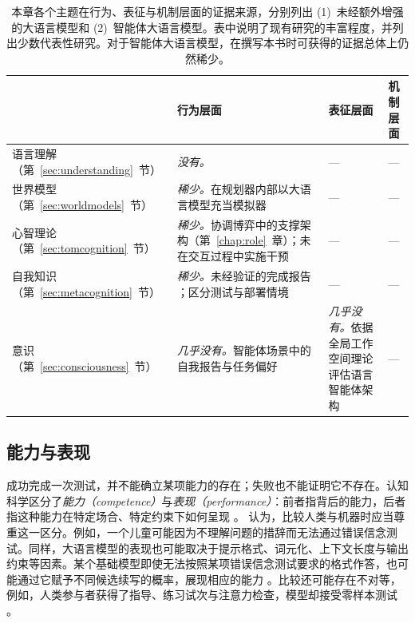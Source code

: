 \begin{table}
\begin{subtable}{\textwidth}
\begin{tabularx}{\linewidth}{@{}p{2.1cm}XXX@{}}
\toprule
 & \textbf{行为层面} & \textbf{表征层面} & \textbf{机制层面} \\
\midrule
语言理解（第~\ref{sec:understanding}~节） &
\emph{没有。} &
--- &
--- \\
\addlinespace
世界模型（第~\ref{sec:worldmodels}~节） &
\emph{稀少。}在规划器内部以大语言模型充当模拟器 \citep{hao2023reasoning,gu2024your} &
--- &
--- \\
\addlinespace
心智理论（第~\ref{sec:tomcognition}~节） &
\emph{稀少。}协调博弈中的支撑架构（第~\ref{chap:role}~章）；未在交互过程中实施干预 &
--- &
--- \\
\addlinespace
自我知识（第~\ref{sec:metacognition}~节） &
\emph{稀少。}未经验证的完成报告 \citep{shapira2026agentschaos}；区分测试与部署情境 \citep{needham2025large} &
--- &
--- \\
\addlinespace
意识（第~\ref{sec:consciousness}~节） &
\emph{几乎没有。}智能体场景中的自我报告与任务偏好 \citep{gray2025agentic} &
\emph{几乎没有。}依据全局工作空间理论评估语言智能体架构 \citep{goldstein2024case} &
--- \\
\bottomrule
\end{tabularx}
\caption{在交互中研究的智能体大语言模型}\label{tab:levels-agentic}
\end{subtable}

\caption{本章各个主题在行为、表征与机制层面的证据来源，分别列出 (1)~未经额外增强的大语言模型和 (2)~智能体大语言模型。表中说明了现有研究的丰富程度，并列出少数代表性研究。对于智能体大语言模型，在撰写本书时可获得的证据总体上仍然稀少。}\label{tab:levels}
\end{table}

\subsection{能力与表现} \label{sec:competence}
成功完成一次测试，并不能确立某项能力的存在；失败也不能证明它不存在。认知科学区分了\emph{能力（competence）}与\emph{表现（performance）}：前者指背后的能力，后者指这种能力在特定场合、特定约束下如何呈现 \citep{chomsky1965aspects}。\citet{firestone2020perf} 认为，比较人类与机器时应当尊重这一区分。例如，一个儿童可能因为不理解问题的措辞而无法通过错误信念测试。同样，大语言模型的表现也可能取决于提示格式、词元化、上下文长度与输出约束等因素。某个基础模型即使无法按照某项错误信念测试要求的格式作答，也可能通过它赋予不同候选续写的概率，展现相应的能力 \citep{kouwenhoven2026traces}。比较还可能存在不对等，例如，人类参与者获得了指导、练习试次与注意力检查，模型却接受零样本测试 \citep{lampinen2024can}。

